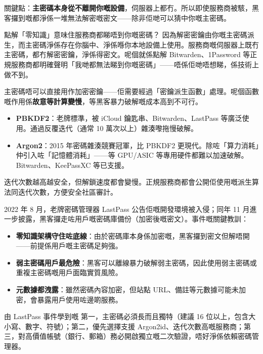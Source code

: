 關鍵點：\textbf{主密碼本身從不離開你嘅設備}，伺服器上都冇。所以即使服務商被駭，黑客攞到嘅都淨係一堆無法解密嘅密文——除非佢哋可以猜中你嘅主密碼。

\begin{tcbinfo}{點解「零知識」意味住服務商都睇唔到你嘅密碼？}
因為解密密鑰由你嘅主密碼派生，而主密碼淨係存在你腦中、淨係喺你本地設備上使用。服務商嘅伺服器上既冇主密碼，都冇解密密鑰，淨係得密文。呢個就係點解 Bitwarden、1Password 等正規服務商都明確聲明「我哋都無法睇到你嘅密碼」——唔係佢哋唔想睇，係技術上做不到。

\end{tcbinfo}


主密碼唔可以直接用作加密密鑰——佢需要經過「密鑰派生函數」處理。呢個函數嘅作用係\textbf{故意等計算變慢}，等黑客暴力破解嘅成本高到不可行。

\begin{itemize}
  \item \textbf{PBKDF2}：老牌標準，被 iCloud 鑰匙串、Bitwarden、LastPass 等廣泛使用。通過反覆迭代（通常 10 萬次以上）雜湊嚟拖慢破解。
  \item \textbf{Argon2}：2015 年密碼雜湊競賽冠軍，比 PBKDF2 更現代。除咗「算力消耗」仲引入咗「記憶體消耗」——等 GPU/ASIC 等專用硬件都難以加速破解。Bitwarden、KeePassXC 等已支援。
\end{itemize}

迭代次數越高越安全，但解鎖速度都會變慢。正規服務商都會公開佢使用嘅派生算法同迭代次數，方便安全社區審計。


2022 年 8 月，老牌密碼管理器 LastPass 公告佢嘅開發環境被入侵；同年 11 月進一步披露，黑客攞走咗用戶嘅密碼庫備份（加密後嘅密文）。事件嘅關鍵教訓：

\begin{itemize}
  \item \textbf{零知識架構守住咗底線}：由於密碼庫本身係加密嘅，黑客攞到密文但解唔開——前提係用戶嘅主密碼足夠強。
  \item \textbf{弱主密碼用戶最危險}：黑客可以離線暴力破解弱主密碼，因此使用弱主密碼或重複主密碼嘅用戶面臨實質風險。
  \item \textbf{元數據都洩露}：雖然密碼內容加密，但站點 URL、備註等元數據可能未加密，會暴露用戶使用咗邊啲服務。
\end{itemize}

\begin{tcbwarn}{由 LastPass 事件學到嘅}
第一，主密碼必須長而且獨特（建議 16 位以上，包含大小寫、數字、符號）；第二，優先選擇支援 Argon2id、迭代次數高嘅服務商；第三，對高價值帳號（銀行、郵箱）務必開啟獨立嘅二次驗證，唔好淨係依賴密碼管理器。

\end{tcbwarn}

